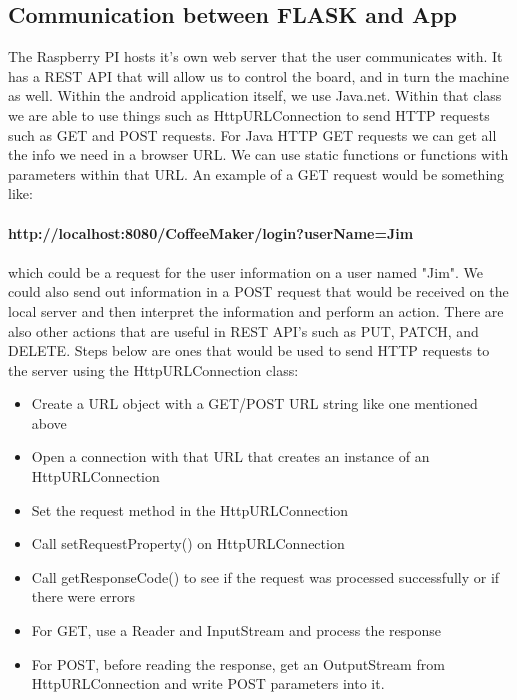 \documentclass[conference]{IEEEtran}
\begin{document}
\subsection{Communication between FLASK and App}
The Raspberry PI hosts it's own web server that the
user communicates with. It has a REST API that will
allow us to control the board, and in turn the machine
as well. Within the android application itself, we use
Java.net. Within that class we are able to use things such
as HttpURLConnection to send HTTP requests such as
GET and POST requests. For Java HTTP GET requests we
can get all the info we need in a browser URL. We can
use static functions or functions with parameters within that
URL. An example of a GET request would be something like: \\ \\
\textbf{http://localhost:8080/CoffeeMaker/login?userName=Jim}\\ \\which could
be a request for the user information on a user named "Jim". We could also send
out information in a POST request that would be received on the local server
and then interpret the information and perform an action. There are also other
actions that are useful in REST API's such as PUT, PATCH, and DELETE. Steps
below are ones that would be used to send HTTP requests to the server using the
HttpURLConnection class:
\begin{itemize}
\item Create a URL object with a GET/POST URL string like one mentioned above
\item Open a connection with that URL that creates an instance of an HttpURLConnection
\item Set the request method in the HttpURLConnection
\item Call setRequestProperty() on HttpURLConnection
\item Call getResponseCode() to see if the request was processed successfully or
if there were errors
\item For GET, use a Reader and InputStream and process the response
\item For POST, before reading the response, get an OutputStream from
HttpURLConnection and write POST parameters into it.
\end{itemize} 
\ \\
\end{document}
